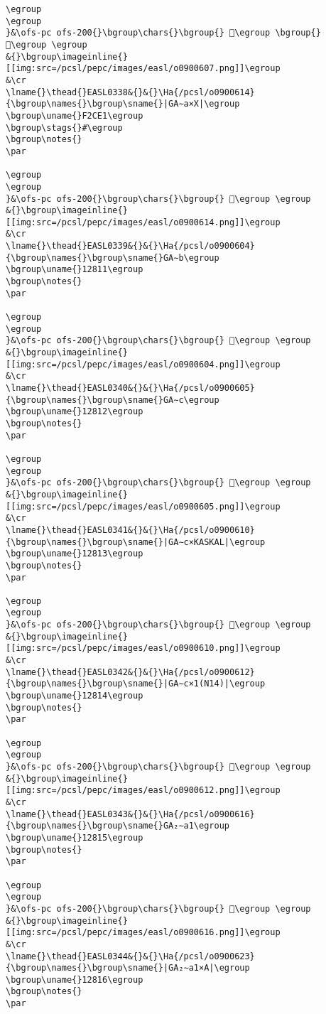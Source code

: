\begin{verbatim}
\egroup
\egroup
}&\ofs-pc ofs-200{}\bgroup\chars{}\bgroup{} 𒠌\egroup \bgroup{} 𒠐\egroup \egroup
&{}\bgroup\imageinline{}[[img:src=/pcsl/pepc/images/easl/o0900607.png]]\egroup
&\cr
\lname{}\thead{}EASL0338&{}&{}\Ha{/pcsl/o0900614}{\bgroup\names{}\bgroup\sname{}|GA∼a×X|\egroup
\bgroup\uname{}F2CE1\egroup
\bgroup\stags{}#\egroup
\bgroup\notes{}
\par 

\egroup
\egroup
}&\ofs-pc ofs-200{}\bgroup\chars{}\bgroup{} 󲳡\egroup \egroup
&{}\bgroup\imageinline{}[[img:src=/pcsl/pepc/images/easl/o0900614.png]]\egroup
&\cr
\lname{}\thead{}EASL0339&{}&{}\Ha{/pcsl/o0900604}{\bgroup\names{}\bgroup\sname{}GA∼b\egroup
\bgroup\uname{}12811\egroup
\bgroup\notes{}
\par 

\egroup
\egroup
}&\ofs-pc ofs-200{}\bgroup\chars{}\bgroup{} 𒠑\egroup \egroup
&{}\bgroup\imageinline{}[[img:src=/pcsl/pepc/images/easl/o0900604.png]]\egroup
&\cr
\lname{}\thead{}EASL0340&{}&{}\Ha{/pcsl/o0900605}{\bgroup\names{}\bgroup\sname{}GA∼c\egroup
\bgroup\uname{}12812\egroup
\bgroup\notes{}
\par 

\egroup
\egroup
}&\ofs-pc ofs-200{}\bgroup\chars{}\bgroup{} 𒠒\egroup \egroup
&{}\bgroup\imageinline{}[[img:src=/pcsl/pepc/images/easl/o0900605.png]]\egroup
&\cr
\lname{}\thead{}EASL0341&{}&{}\Ha{/pcsl/o0900610}{\bgroup\names{}\bgroup\sname{}|GA∼c×KASKAL|\egroup
\bgroup\uname{}12813\egroup
\bgroup\notes{}
\par 

\egroup
\egroup
}&\ofs-pc ofs-200{}\bgroup\chars{}\bgroup{} 𒠓\egroup \egroup
&{}\bgroup\imageinline{}[[img:src=/pcsl/pepc/images/easl/o0900610.png]]\egroup
&\cr
\lname{}\thead{}EASL0342&{}&{}\Ha{/pcsl/o0900612}{\bgroup\names{}\bgroup\sname{}|GA∼c×1(N14)|\egroup
\bgroup\uname{}12814\egroup
\bgroup\notes{}
\par 

\egroup
\egroup
}&\ofs-pc ofs-200{}\bgroup\chars{}\bgroup{} 𒠔\egroup \egroup
&{}\bgroup\imageinline{}[[img:src=/pcsl/pepc/images/easl/o0900612.png]]\egroup
&\cr
\lname{}\thead{}EASL0343&{}&{}\Ha{/pcsl/o0900616}{\bgroup\names{}\bgroup\sname{}GA₂∼a1\egroup
\bgroup\uname{}12815\egroup
\bgroup\notes{}
\par 

\egroup
\egroup
}&\ofs-pc ofs-200{}\bgroup\chars{}\bgroup{} 𒠕\egroup \egroup
&{}\bgroup\imageinline{}[[img:src=/pcsl/pepc/images/easl/o0900616.png]]\egroup
&\cr
\lname{}\thead{}EASL0344&{}&{}\Ha{/pcsl/o0900623}{\bgroup\names{}\bgroup\sname{}|GA₂∼a1×A|\egroup
\bgroup\uname{}12816\egroup
\bgroup\notes{}
\par 


\end{verbatim}
